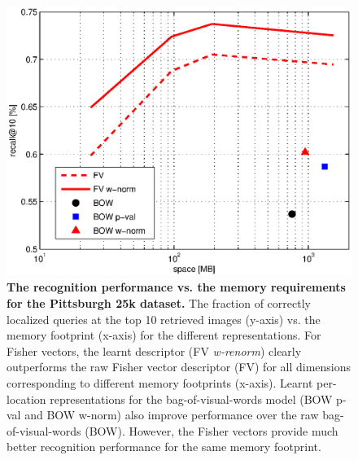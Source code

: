    \begin{figure}[t!]
        \centering
        \includegraphics[width=1.1\linewidth]{imgs/FVmemory03}    
        \caption{
            \textbf{The recognition performance vs. the memory requirements for the Pittsburgh 25k dataset.} 
            The fraction of correctly localized queries at the top 10 retrieved images (y-axis) vs. the memory footprint (x-axis) for the different representations. For Fisher vectors, the learnt descriptor (FV \emph{w-renorm}) clearly outperforms the raw Fisher vector descriptor (FV) for all dimensions corresponding to different memory footprints (x-axis). 
            Learnt per-location representations for the bag-of-visual-words model (BOW p-val and BOW w-norm) also improve performance over the raw bag-of-visual-words (BOW). However, the Fisher vectors provide much better recognition performance for the same memory footprint.  
        }
        \label{fig:memory}
    \end{figure}

